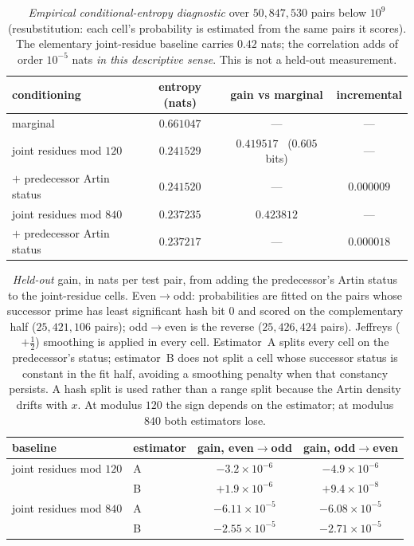 \documentclass[11pt,reqno]{amsart}
\theoremstyle{plain}
\theoremstyle{definition}
\begin{document}
\begin{table}[t]
	\centering
	\begin{tabular}{lccc}
		\toprule
		conditioning & entropy (nats) & gain vs marginal & incremental \\
		\midrule
		marginal & $0.661047$ & --- & --- \\
		joint residues mod $120$ & $0.241529$ & $0.419517$ \ ($0.605$ bits) & --- \\
		\quad $+$ predecessor Artin status & $0.241520$ & --- & $\mathbf{0.000009}$ \\
		\midrule
		joint residues mod $840$ & $0.237235$ & $0.423812$ & --- \\
		\quad $+$ predecessor Artin status & $0.237217$ & --- & $\mathbf{0.000018}$ \\
		\bottomrule
	\end{tabular}
	\caption{\emph{Empirical conditional-entropy diagnostic} over $50{,}847{,}530$ pairs below
	$10^9$ (resubstitution: each cell's probability is estimated from the same pairs it scores).
	The elementary joint-residue baseline carries $0.42$ nats; the correlation adds of order
	$10^{-5}$ nats \emph{in this descriptive sense}. This is not a held-out measurement.}
	\label{tab:content}
\end{table}

\begin{table}[t]
	\centering
	\begin{tabular}{llcc}
		\toprule
		baseline & estimator & gain, even$\to$odd & gain, odd$\to$even \\
		\midrule
		joint residues mod $120$ & A & $-3.2\times10^{-6}$ & $-4.9\times10^{-6}$ \\
		& B & $+1.9\times10^{-6}$ & $+9.4\times10^{-8}$ \\
		\midrule
		joint residues mod $840$ & A & $-6.11\times10^{-5}$ & $-6.08\times10^{-5}$ \\
		& B & $-2.55\times10^{-5}$ & $-2.71\times10^{-5}$ \\
		\bottomrule
	\end{tabular}
	\caption{\emph{Held-out} gain, in nats per test pair, from adding the predecessor's Artin
	status to the joint-residue cells. Even$\to$odd: probabilities are fitted on the pairs whose
	successor prime has least significant hash bit $0$ and scored on the complementary half
	($25{,}421{,}106$ pairs); odd$\to$even is the reverse ($25{,}426{,}424$ pairs). Jeffreys
	($+\tfrac12$) smoothing is applied in every cell. Estimator~A splits every cell on the
	predecessor's status; estimator~B does not split a cell whose successor status is constant in
	the fit half, avoiding a smoothing penalty when that constancy persists. A hash split is used rather than
	a range split because the Artin density drifts with $x$. At modulus $120$ the sign depends on
	the estimator; at modulus $840$ both estimators lose.}
	\label{tab:holdout}
\end{table}
\end{document}
